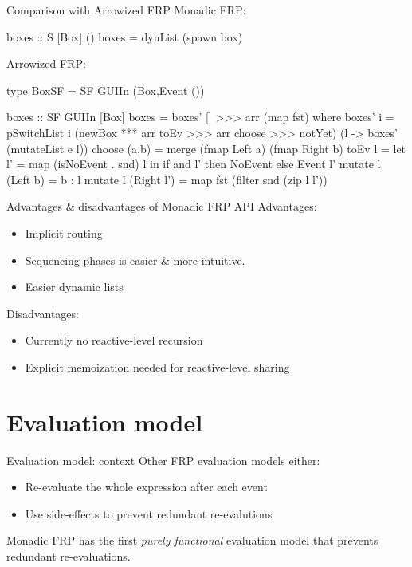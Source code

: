 \documentclass{beamer}
\begin{document}
\begin{frame}{Comparison with Arrowized FRP}
Monadic FRP:
\begin{code}
boxes :: S [Box] ()
boxes = dynList (spawn box)
\end{code}
Arrowized FRP:
\begin{code}
type BoxSF  = SF GUIIn (Box,Event ())

boxes :: SF GUIIn [Box]
boxes = boxes' [] >>> arr (map fst) where
  boxes' i = pSwitchList i
    (newBox *** arr toEv >>> arr choose >>> notYet)
    (\e l -> boxes' (mutateList e l))
choose (a,b) = merge (fmap Left a) (fmap Right b)
toEv l =  let l' = map (isNoEvent . snd) l 
          in if and l' then NoEvent else Event l'
mutate l (Left b)   = b : l
mutate l (Right l') = map fst (filter snd (zip l l'))
\end{code}
\end{frame}

\begin{frame}{Advantages \& disadvantages of Monadic FRP API}
Advantages: 
\begin{itemize}
\item Implicit routing
\item Sequencing phases is easier \& more intuitive.
\item Easier dynamic lists 
\end{itemize}
Disadvantages:
\begin{itemize}
\item Currently no reactive-level recursion
\item Explicit memoization needed for reactive-level sharing
\end{itemize}
\end{frame}

\section{Evaluation model}
\begin{frame}{Evaluation model: context}
Other FRP evaluation models either:
\begin{itemize}
\item Re-evaluate the whole expression after each event
\item Use side-effects to prevent redundant re-evalutions
\end{itemize}

Monadic FRP has the first \emph{purely functional} evaluation model that prevents redundant re-evaluations.

\end{frame}
\end{document}
